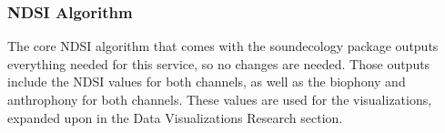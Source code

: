 \subsubsection{NDSI Algorithm}
The core NDSI algorithm that comes with the soundecology package outputs everything needed for this service, so no changes are needed. Those outputs include the NDSI values for both channels, as well as the biophony and anthrophony for both channels. These values are used for the visualizations, expanded upon in the Data Visualizations Research section.
